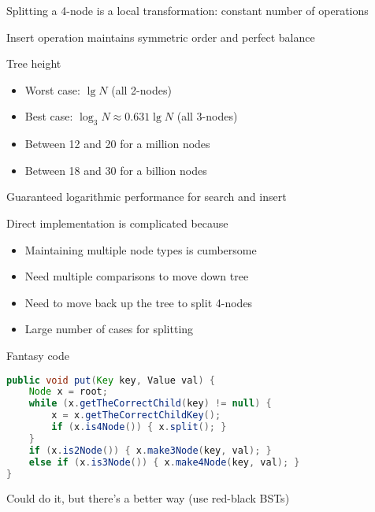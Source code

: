 \documentclass[8pt,a4paper,compress]{beamer}
\begin{document}
\begin{frame}[fragile]
\pause

Splitting a 4-node is a local transformation: constant number of operations

\pause
\bigskip

Insert operation maintains symmetric order and perfect balance

\pause
\bigskip

Tree height
\begin{itemize}
\item Worst case: $\lg N$ (all 2-nodes)

\item Best case: $\log_3 N \approx 0.631 \lg N$ (all 3-nodes)

\item Between 12 and 20 for a million nodes

\item Between 18 and 30 for a billion nodes
\end{itemize}

\pause
\bigskip

Guaranteed logarithmic performance for search and insert
\end{frame}

\begin{frame}[fragile]
\pause

Direct implementation is complicated because
\begin{itemize}
\item Maintaining multiple node types is cumbersome
\item Need multiple comparisons to move down tree
\item Need to move back up the tree to split 4-nodes
\item Large number of cases for splitting
\end{itemize}

\pause
\bigskip

Fantasy code
\begin{lstlisting}[language=Java]
public void put(Key key, Value val) {
    Node x = root;
    while (x.getTheCorrectChild(key) != null) {
        x = x.getTheCorrectChildKey();
        if (x.is4Node()) { x.split(); }
    }
    if (x.is2Node()) { x.make3Node(key, val); }
    else if (x.is3Node()) { x.make4Node(key, val); }
}
\end{lstlisting}

\pause
\bigskip

Could do it, but there's a better way (use red-black BSTs)
\end{frame}
\end{document}
